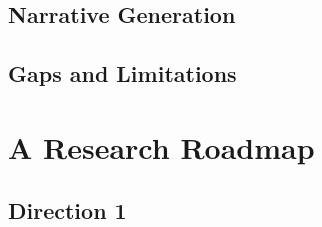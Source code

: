 \documentclass[11pt,a4paper]{article}
\begin{document}
\subsection{Narrative Generation}


\subsection{Gaps and Limitations}


\section{A Research Roadmap}
\label{sec:roadmap}


%

\subsection{Direction 1}
\end{document}
